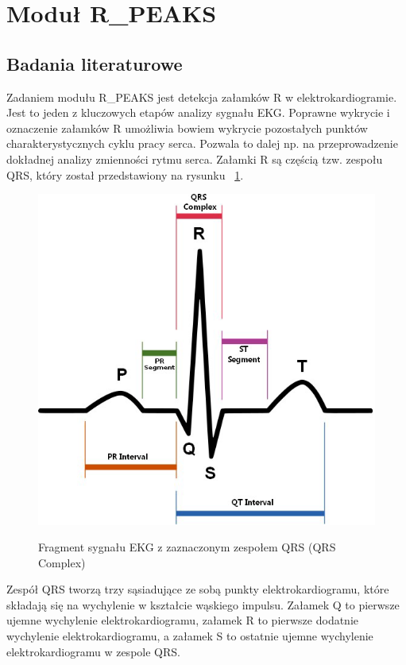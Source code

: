 \setcounter{secnumdepth}{3}
\section{Moduł R\_PEAKS}
\subsection{Badania literaturowe}

Zadaniem modułu R\_PEAKS jest detekcja załamków R w elektrokardiogramie. Jest to jeden z kluczowych etapów analizy sygnału EKG. Poprawne wykrycie i oznaczenie załamków R umożliwia bowiem wykrycie pozostałych punktów charakterystycznych cyklu pracy serca. Pozwala to dalej np. na przeprowadzenie dokładnej analizy zmienności rytmu serca. Załamki R są częścią tzw. zespołu QRS, który został przedstawiony na rysunku ~\ref{fig:RP_QRS}.
\begin{figure}[H]
\centering
\includegraphics[scale=0.7]{R_PEAKS/img/qrs_class}
\label{fig:RP_QRS}
\caption{Fragment sygnału EKG z zaznaczonym zespołem QRS (QRS Complex)}
\end{figure}
Zespół QRS tworzą trzy sąsiadujące ze sobą punkty elektrokardiogramu, które składają się na wychylenie w kształcie wąskiego impulsu. Załamek Q to pierwsze ujemne wychylenie elektrokardiogramu, załamek R to pierwsze dodatnie wychylenie elektrokardiogramu, a załamek S to ostatnie ujemne wychylenie elektrokardiogramu w zespole QRS.

